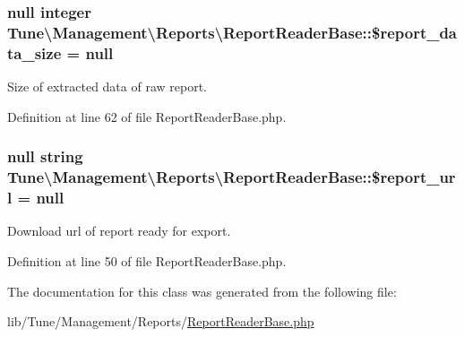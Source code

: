 \hypertarget{classTune_1_1Management_1_1Reports_1_1ReportReaderBase_a41566a442e241ede89e506901b39fb9e}{
\subsubsection[{\$report\-\_\-data\-\_\-size}]{\setlength{\rightskip}{0pt plus 5cm}null integer Tune\textbackslash{}\-Management\textbackslash{}\-Reports\textbackslash{}\-Report\-Reader\-Base\-::\$report\-\_\-data\-\_\-size = null\hspace{0.3cm}{\ttfamily [protected]}}}\label{classTune_1_1Management_1_1Reports_1_1ReportReaderBase_a41566a442e241ede89e506901b39fb9e}


Size of extracted data of raw report. 



Definition at line 62 of file Report\-Reader\-Base.\-php.

\hypertarget{classTune_1_1Management_1_1Reports_1_1ReportReaderBase_a90591d693700efd4d05f2b43ac08b552}{
\subsubsection[{\$report\-\_\-url}]{\setlength{\rightskip}{0pt plus 5cm}null string Tune\textbackslash{}\-Management\textbackslash{}\-Reports\textbackslash{}\-Report\-Reader\-Base\-::\$report\-\_\-url = null\hspace{0.3cm}{\ttfamily [protected]}}}\label{classTune_1_1Management_1_1Reports_1_1ReportReaderBase_a90591d693700efd4d05f2b43ac08b552}


Download url of report ready for export. 



Definition at line 50 of file Report\-Reader\-Base.\-php.



The documentation for this class was generated from the following file\-:\begin{DoxyCompactItemize}
\item 
lib/\-Tune/\-Management/\-Reports/\hyperlink{ReportReaderBase_8php}{Report\-Reader\-Base.\-php}\end{DoxyCompactItemize}
